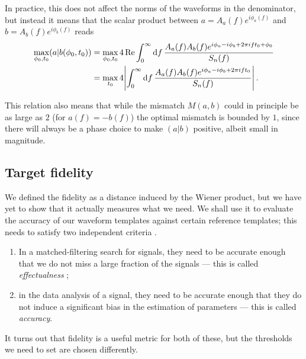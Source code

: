 \documentclass[main.tex]{subfiles}
\begin{document}
In practice, this does not affect the norms of the waveforms in the denominator, but instead it means that the scalar product between \(a = A_a(f) e^{i \phi _a (f)}\) and \(b = A_b (f) e^{i \phi _b (f)}\) reads 
%
\begin{subequations}
\begin{align}
\max_{\phi_0 , t_0 } (a|b(\phi_0 , t_0 )) 
&= \max_{\phi_0, t_0 } 4 \Re \int_{0}^{\infty } \dd{f} \frac{A_a (f) A_b(f) e^{i \phi_a - i \phi _b + 2 \pi i f t_0 + \phi_0 }}{S_n (f)} \\
&= \max_{t_0 } 4 \abs{\int_{0}^{\infty } \dd{f} \frac{A_a (f) A_b(f) e^{i \phi_a - i \phi _b + 2 \pi i f t_0 }}{S_n (f)}}
\,.
\end{align}
\end{subequations}

This relation also means that while the mismatch \(M(a, b)\) could in principle be as large as \(2\) (for \(a(f) = -b(f)\)) the optimal mismatch is bounded by \(1\), since there will always be a phase choice to make \((a|b)\) positive, albeit small in magnitude.


\subsection{Target fidelity} \label{sec:target-fidelity}

We defined the fidelity as a distance induced by the Wiener product, but we have yet to show that it actually measures what we need. 
We shall use it to evaluate the accuracy of our waveform templates against certain reference templates; this needs to satisfy two independent criteria \cite{lindblomModelWaveformAccuracy2008}.

\begin{enumerate}
    \item In a matched-filtering search for signals, they need to be accurate enough that we do not miss a large fraction of the signals --- this is called \emph{effectualness} \cite[]{damourAccuracyEffectualnessClosedform2011};
    \item in the data analysis of a signal, they need to be accurate enough that they do not induce a significant bias in the estimation of parameters --- this is called \emph{accuracy}.
\end{enumerate}

It turns out that fidelity is a useful metric for both of these, but the thresholds we need to set are chosen differently.
\end{document}
